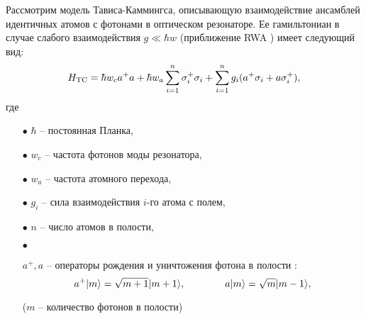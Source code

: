Рассмотрим модель Тависа-Каммингса, описывающую взаимодействие ансамблей идентичных атомов с фотонами в оптическом резонаторе. Ее гамильтониан в случае слабого
взаимодействия $g \ll \hbar w$ (приближение RWA \cite{ozhigov_qq}) имеет следующий вид:
\[
H_{\text{TC}} = \hbar w_{c}a^{+}a + \hbar w_{a} \sum_{i=1}^{n}\sigma_{i}^{+}\sigma_{i} + \sum_{i=1}^{n}g_{i}(a^{+}\sigma_{i} + a\sigma^{+}_{i}),
\]
где
\begin{itemize}
	\item[$\bullet$]{$\hbar$ -- постоянная Планка,}
	\item[$\bullet$]{$w_{c}$ -- частота фотонов моды резонатора,}
	\item[$\bullet$]{$w_{a}$ -- частота атомного перехода,}
	\item[$\bullet$]{$g_{i}$ -- сила взаимодействия $i$-го атома с полем,}
	\item[$\bullet$]{$n$ --  число атомов в полости,}
	\item[$\bullet$]{$a^{+}, a$ -- операторы рождения и уничтожения фотона в полости \cite{messia}:\\
		\begin{equation}
			a^{+}|m\rangle = \sqrt{m+1}|m+1\rangle,\qquad\qquad a|m\rangle = \sqrt{m}|m-1\rangle,
		\end{equation}
		\begin{center}($m$ -- количество фотонов в полости)\end{center}
		\
		
}
\end{itemize}
